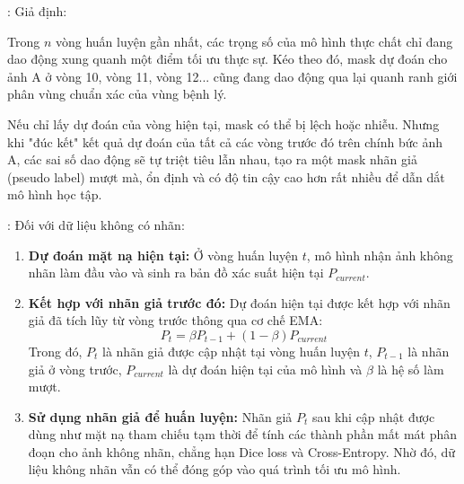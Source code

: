\begin{frame}{\secname: \subsecname}
    Giả định:
    
    Trong $n$ vòng huấn luyện gần nhất, các trọng số của mô hình thực chất chỉ đang dao động xung quanh một điểm tối ưu thực sự. Kéo theo đó, mask dự đoán cho ảnh A ở vòng 10, vòng 11, vòng 12... cũng đang dao động qua lại quanh ranh giới phân vùng chuẩn xác của vùng bệnh lý. 

    \bigskip
    Nếu chỉ lấy dự đoán của vòng hiện tại, mask có thể bị lệch hoặc nhiễu. Nhưng khi "đúc kết" kết quả dự đoán của tất cả các vòng trước đó trên chính bức ảnh A, các sai số dao động sẽ tự triệt tiêu lẫn nhau, tạo ra một mask nhãn giả (pseudo label) mượt mà, ổn định và có độ tin cậy cao hơn rất nhiều để dẫn dắt mô hình học tập.

\end{frame}
\begin{frame}{\secname: \subsecname}
    Đối với dữ liệu không có nhãn:
    \begin{enumerate}
        \item \textbf{Dự đoán mặt nạ hiện tại:} Ở vòng huấn luyện $t$, mô hình nhận ảnh không nhãn làm đầu vào và sinh ra bản đồ xác suất hiện tại $P_{current}$.

        \item \textbf{Kết hợp với nhãn giả trước đó:} Dự đoán hiện tại được kết hợp với nhãn giả đã tích lũy từ vòng trước thông qua cơ chế EMA:
        \[
            P_t = \beta P_{t-1} + (1 - \beta) P_{current}
        \]
        Trong đó, $P_t$ là nhãn giả được cập nhật tại vòng huấn luyện $t$, $P_{t-1}$ là nhãn giả ở vòng trước, $P_{current}$ là dự đoán hiện tại của mô hình và $\beta$ là hệ số làm mượt.

        \item \textbf{Sử dụng nhãn giả để huấn luyện:} Nhãn giả $P_t$ sau khi cập nhật được dùng như mặt nạ tham chiếu tạm thời để tính các thành phần mất mát phân đoạn cho ảnh không nhãn, chẳng hạn Dice loss và Cross-Entropy. Nhờ đó, dữ liệu không nhãn vẫn có thể đóng góp vào quá trình tối ưu mô hình.
    \end{enumerate}
\end{frame}


